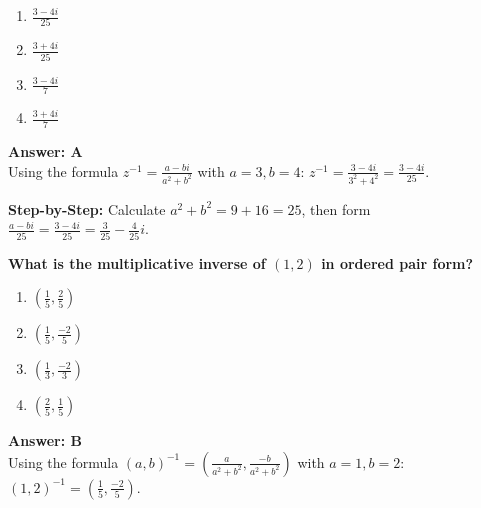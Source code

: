 \documentclass[12pt,a4paper]{article}
\begin{document}
\begin{partbox}[Options]
\begin{enumerate}[label=\Alph*.]
    \item \( \frac{3 - 4i}{25} \)
    \item \( \frac{3 + 4i}{25} \)
    \item \( \frac{3 - 4i}{7} \)
    \item \( \frac{3 + 4i}{7} \)
\end{enumerate}
\end{partbox}

\begin{answerstyle}
\textbf{Answer: A} \\
Using the formula \( z^{-1} = \frac{a - bi}{a^2 + b^2} \) with \( a = 3, b = 4 \): \( z^{-1} = \frac{3 - 4i}{3^2 + 4^2} = \frac{3 - 4i}{25} \).
\end{answerstyle}

\begin{conceptbox}
\textbf{Step-by-Step:} Calculate \( a^2 + b^2 = 9 + 16 = 25 \), then form \( \frac{a - bi}{25} = \frac{3 - 4i}{25} = \frac{3}{25} - \frac{4}{25}i \).
\end{conceptbox}

\newpage
\begin{questiontitle}[MCQ 63]
\textbf{What is the multiplicative inverse of \( (1, 2) \) in ordered pair form?}
\end{questiontitle}

\begin{partbox}[Options]
\begin{enumerate}[label=\Alph*.]
    \item \( \left(\frac{1}{5}, \frac{2}{5}\right) \)
    \item \( \left(\frac{1}{5}, \frac{-2}{5}\right) \)
    \item \( \left(\frac{1}{3}, \frac{-2}{3}\right) \)
    \item \( \left(\frac{2}{5}, \frac{1}{5}\right) \)
\end{enumerate}
\end{partbox}

\begin{answerstyle}
\textbf{Answer: B} \\
Using the formula \( (a, b)^{-1} = \left(\frac{a}{a^2 + b^2}, \frac{-b}{a^2 + b^2}\right) \) with \( a = 1, b = 2 \): \( (1, 2)^{-1} = \left(\frac{1}{5}, \frac{-2}{5}\right) \).
\end{answerstyle}
\end{document}
